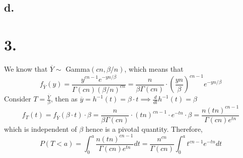 \documentclass[11pt]{article}
\begin{document}
\subsection*{d.}
\pagebreak
\section*{3.}
We know that $\overline{Y} \sim $ Gamma$(cn, \beta/n )$, which means that 
\[
    f_{\overline{Y}}(y) = \frac{y^{cn-1} e^{-yn/\beta}}{\Gamma(cn) {(\beta/n)^{cn}}} = \frac{n}{\beta \Gamma(cn)} \cdot \left(\frac{yn}{\beta} \right)^{cn-1} e^{-yn/\beta}
\]
Consider $T = \frac{\overline{Y}}{\beta}$, then as $\overline{y} = h^{-1}(t) = \beta \cdot t \implies \frac{d}{dt} h^{-1}(t) = \beta$
\[
    f_T(t) =  f_{\overline{Y}}(\beta \cdot t) \cdot \beta = \frac{n}{\beta \Gamma(cn)} \cdot (tn)^{cn-1} \cdot e^{-tn} \cdot \beta = \frac{n (tn)^{cn-1}}{\Gamma(cn) e^{tn}}
\]
which is independent of $\beta$ hence is a pivotal quantity.
Therefore, 
\[
    P(T<a) = \int_0^a \frac{n (tn)^{cn-1}}{\Gamma(cn) e^{tn}} dt = \frac{n^{cn}}{\Gamma(cn)} \int_0^a t^{cn-1}e^{-tn} dt
\]
\end{document}
